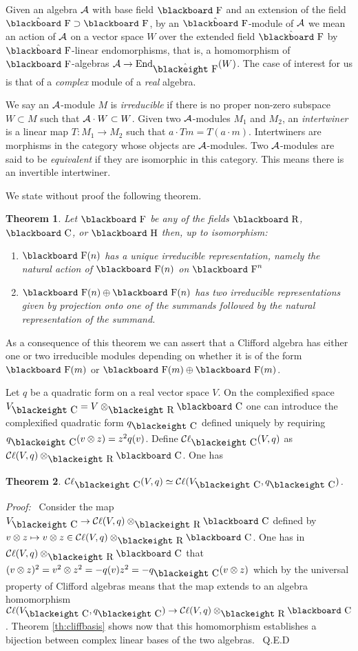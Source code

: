 \documentclass[12pt,titlepage]{article}
\def\bbf#1{\hbox{\blackboard #1}}
\def\bbfeight#1{\hbox{\blackeight #1}}
\def\lC{\bbf C}
\def\lCe{\bbfeight C}
\def\lF{\bbf F}
\def\lFe{\bbfeight F}
\def\lH{\bbf H}
\def\lR{\bbf R}
\def\lRe{\bbfeight R}
\def\cA{{\cal A}}
\def\cC{{\cal C}}
\def\Cl{{\cC\ell}}
\def\End{\hbox{End}}
\newtheorem{theorem}{Theorem}
\newenvironment{proof}{{\em Proof:\/}\ }{\ Q.E.D}
\begin{document}
Given an algebra \(\cA\) with base field \(\lF\) and an extension of the
field \(\hat{\lF} \supset \lF\), by an \(\hat{\lF}\)-module of \(\cA\) we
mean an action of \(\cA\) on a vector space \(W\) over the extended
field \(\hat{\lF}\) by \(\hat{\lF}\)-linear endomorphisms, that is,
a homomorphism of  \(\lF\)-algebras \(\cA\to \End_{\hat{\lFe}}(W)\). The
case of interest for us is that of a {\em complex\/} module
%
 of a {\em
real\/} algebra.

We say an \(\cA\)-module \(M\) is {\em irreducible\/}
%
 if there is no
proper non-zero subspace \(W\subset M\) such that \(\cA \cdot W \subset W\).
Given two \(\cA\)-modules \(M_1\) and \(M_2\), an {\em intertwiner\/}
%
 is
a linear map \(T:M_1\to M_2\) such that \(a\cdot Tm = T(a\cdot m)\).
Intertwiners are morphisms in the category whose objects are 
\(\cA\)-modules. Two \(\cA\)-modules are said to be {\em equivalent\/}
%
 if they
are isomorphic in this category. This means there is an invertible
intertwiner.

We state without proof the
following theorem.
\begin{theorem}%
Let \(\lF\) be any of the fields \(\lR\), \(\lC\), or \(\lH\) then, up to
isomorphism:
\begin{enumerate}%
\item \(\lF(n)\) has a unique irreducible representation, namely the
natural action of \(\lF(n)\) on \(\lF^n\)
\item \(\lF(n)\oplus\lF(n)\) has two irreducible representations given
by projection onto one of the summands followed by the natural
representation of the summand.
\end{enumerate}%
\end{theorem}%

As a consequence of this theorem we can assert that a Clifford algebra
has either one or two irreducible modules depending on
whether it is of the form
\(\lF(m)\) or \(\lF(m)\oplus\lF(m)\).

Let
\(q\) be a quadratic form on a real vector space \(V\). On the
complexified space \(V_{\lCe} = V\otimes_{\lRe}\lC\) one can introduce the
complexified
quadratic form \(q_{\lCe}\) defined uniquely by requiring 
\(q_{\lCe}(v\otimes
z)=z^2q(v)\).  Define \(\Cl_{\lCe}(V,q)\) as
\(\Cl(V,q)\otimes_{\lRe}\lC\). One has
\begin{theorem}
\(\Cl_{\lCe}(V,q)\simeq \Cl(V_{\lCe},q_{\lCe})\).
\end{theorem}%
\begin{proof}%
Consider the map \(V_{\lCe}\to \Cl(V,q)\otimes_{\lRe}\lC\)
defined by \(v\otimes z \mapsto v\otimes z\in \Cl(V,q)\otimes_{\lRe}\lC\).
One has in \(\Cl(V,q)\otimes_{\lRe}\lC\) that \((v\otimes z)^2 =
v^2\otimes z^2=-q(v)z^2 =-q_{\lCe}(v\otimes z)\) which by the universal
property of Clifford algebras means that the map extends to an algebra
homomorphism \(\Cl(V_{\lCe},q_{\lCe})\to\Cl(V,q)\otimes_{\lRe}\lC\).
Theorem \ref{th:cliffbasis} shows now that this homomorphism establishes a
bijection between complex linear bases of the two algebras. 
\end{proof}%
\end{document}
